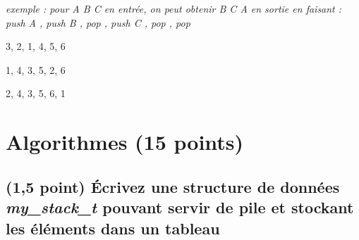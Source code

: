 \documentclass[11pt,a4paper]{article}
\begin{document}
\bigskip

\begin{center}
\noindent \textit{exemple : pour \og A B C \fg{} en entrée, on peut obtenir \og B C A \fg{} en sortie en faisant : \linebreak
\og push A \fg, \og push B \fg, \og pop \fg, \og push C \fg, \og pop \fg, \og pop \fg }
\end{center}

\medskip


\begin{center}

\begin{large}
3, 2, 1, 4, 5, 6
\end{large}

\begin{center}
\end{center}


\begin{large}
1, 4, 3, 5, 2, 6
\end{large}

\begin{center}
\end{center}


\begin{large}
2, 4, 3, 5, 6, 1
\end{large}

\begin{center}
\end{center}

\end{center}

\vfillLast

%
\section{Algorithmes (15 points)}


\subsection{(1,5 point) \'Ecrivez une structure de données \og \textit{my\_stack\_t} \fg{} pouvant servir de pile et stockant les éléments dans un tableau }
\end{document}
